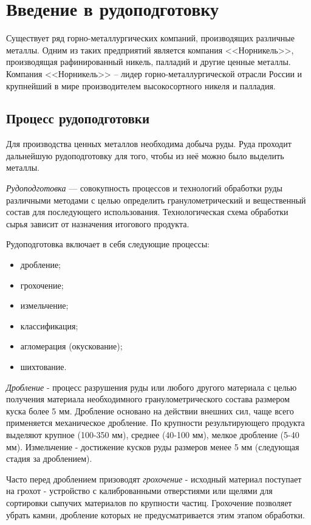 \documentclass[specification,annotation,times]{itmo-student-thesis}
\begin{document}
\section{Введение в рудоподготовку}
Существует ряд горно-металлургических компаний, производящих различные металлы. Одним из таких предприятий является компания <<Норникель>>, производящая рафинированный никель, палладий и другие ценные металлы. Компания <<Норникель>> -- лидер горно-металлургической отрасли России и   крупнейший в мире производителем высокосортного никеля и палладия. 

\subsection{Процесс рудоподготовки}
Для производства ценных металлов необходима добыча руды. Руда проходит дальнейшую рудоподготовку для того, чтобы из неё можно было выделить металлы. 

\textit{Рудоподготовка } --- совокупность процессов и технологий обработки руды различными методами с целью определить гранулометрический и вещественный состав для последующего использования. Технологическая схема обработки сырья  зависит от назначения итогового продукта. 

Рудоподготовка включает в себя следующие процессы: 
\begin{itemize}
\item дробление;
\item грохочение;
\item измельчение;
\item классификация;
\item агломерация (окускование);
\item шихтование.
\end{itemize}

\textit{Дробление} - процесс разрушения руды или любого другого материала с целью получения материала необходимного гранулометрического состава размером куска более 5 мм. Дробление основано на действии внешних сил, чаще всего применяется механическое дробление. По крупности результирующего продукта выделяют крупное (100-350 мм), среднее (40-100 мм), мелкое дробление (5-40 мм).  Измельчение - достижение кусков руды размеров менее 5 мм (следующая стадия за дроблением).

Часто перед дроблением призоводят \textit{грохочение} - исходный материал поступает на грохот - устройство с калиброванными отверстиями или щелями для сортировки сыпучих материалов по крупности частиц. Грохочение позволяет убрать камни, дробление которых не предусматривается этим этапом обработки.
\end{document}
